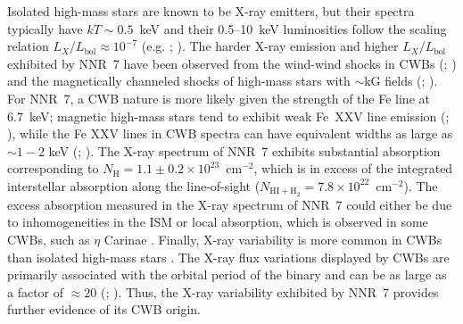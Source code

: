 \documentclass[iop,revtex4]{emulateapj}
\begin{document}
Isolated high-mass stars are known to be X-ray emitters, but their spectra typically have $kT\sim0.5$~keV and their 0.5--10~keV luminosities follow the scaling relation $L_X/L_{\mathrm{bol}}\approx10^{-7}$ (e.g. \citealt{berghoefer97}; \citealt{sana06}).  The harder X-ray emission and higher $L_X/L_{\mathrm{bol}}$ exhibited by NNR~7 have been observed from the wind-wind shocks in CWBs (\citealt{zhekov00}; \citealt{portegies02}) and the magnetically channeled shocks of high-mass stars with $\sim$kG fields (\citealt{gagne05}; \citealt{petit13}).  For NNR~7, a CWB nature is more likely given the strength of the Fe line at 6.7~keV; magnetic high-mass stars tend to exhibit weak Fe~XXV line emission (\citealt{schulz00}; \citealt{schulz03}), while the Fe XXV lines in CWB spectra can have equivalent widths as large as $\sim1-2$ keV (\citealt{viotti04}; \citealt{mikles06}).  The X-ray spectrum of NNR~7 exhibits substantial absorption corresponding to $N_{\mathrm{H}} = 1.1\pm0.2\times10^{23}$~cm$^{-2}$, which is in excess of the integrated interstellar absorption along the line-of-sight ($N_{\mathrm{HI+H_2}}=7.8\times10^{22}$~cm$^{-2}$).  The excess absorption measured in the X-ray spectrum of NNR~7 could either be due to inhomogeneities in the ISM or local absorption, which is observed in some CWBs, such as $\eta$ Carinae \citep{hamaguchi07}.  Finally, X-ray variability is more common in CWBs than isolated high-mass stars \citep{corcoran96}.  The X-ray flux variations displayed by CWBs are primarily associated with the orbital period of the binary and can be as large as a factor of $\approx20$ (\citealt{pittard98}; \citealt{corcoran05}).  Thus, the X-ray variability exhibited by NNR~7 provides further evidence of its CWB origin.\par
\end{document}
